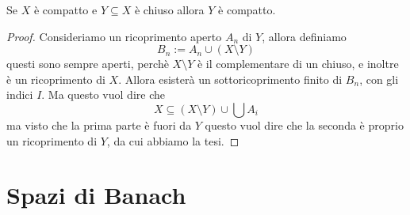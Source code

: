 \documentclass[11pt]{scrartcl}
\begin{document}
	\begin{exercise}
		Se $X$ è compatto e $Y\subseteq X$ è chiuso allora $Y$ è compatto.
	\end{exercise}
	\begin{proof}
		Consideriamo un ricoprimento aperto $A_n$ di $Y$, allora definiamo 
		$$B_n:=A_n\cup \left(X\setminus Y\right)$$
		questi sono sempre aperti, perchè $X\setminus Y$ è il complementare di un chiuso, e inoltre è un ricoprimento di $X$. Allora esisterà un sottoricoprimento finito di $B_n$, con gli indici $I$. Ma questo vuol dire che 
		$$X\subseteq \left(X\setminus Y\right)\cup\bigcup A_i $$
		ma visto che la prima parte è fuori da $Y$ questo vuol dire che la seconda è proprio un ricoprimento di $Y$, da cui abbiamo la tesi. 
	\end{proof}
	
	\newpage
	
	\section{Spazi di Banach}
	
\end{document}
